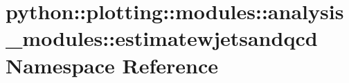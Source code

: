\hypertarget{namespacepython_1_1plotting_1_1modules_1_1analysis__modules_1_1estimatewjetsandqcd}{
\section{python::plotting::modules::analysis\_\-modules::estimatewjetsandqcd Namespace Reference}
\label{namespacepython_1_1plotting_1_1modules_1_1analysis__modules_1_1estimatewjetsandqcd}
}

